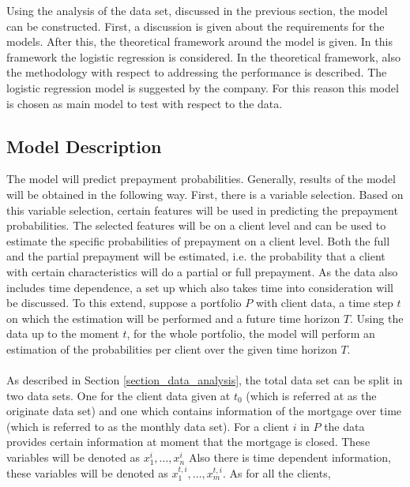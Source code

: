 Using the analysis of the data set, discussed in the previous 
section, the model can be constructed. First, a discussion is given 
about the requirements for the models. After this, the theoretical 
framework around the model is given. In this framework the logistic 
regression is considered. In the theoretical framework, also the 
methodology with respect to addressing the performance is described.
The logistic regression model is suggested by the company. 
For this reason this model is chosen as main model to test with respect 
to the data.  

\subsection{Model Description}
    The model will predict prepayment probabilities. 
    Generally, results of the model will be obtained in the following 
    way. 
    First, there is a variable selection. Based on this variable
    selection, certain features will be used in predicting the prepayment  
    probabilities. The selected features will be on a client level and 
    can be used to estimate the specific probabilities of prepayment 
    on a client level. Both the full and the partial prepayment will 
    be estimated, i.e. the probability that a client with certain 
    characteristics will do a partial or full prepayment. 
    As the data also includes time dependence, a set up which also 
    takes time into consideration will be discussed. To this extend, 
    suppose a portfolio $P$ with client data, a time step $t$ on 
    which the estimation will be performed and a future time horizon $T$. 
    Using the data up to the moment $t$, for the whole portfolio, 
    the model will perform an estimation of the probabilities per 
    client over the given time horizon $T$. 
    \\\\ 
    As described in Section \ref{section_data_analysis}, 
    the total data set can be split in two data sets. One for the 
    client data given at $t_0$ (which is referred at as
    the originate data set) and one which contains information of 
    the mortgage over time (which is referred to as the monthly 
    data set). For a client $i$ in $P$ the data provides certain 
    information at moment that the mortgage is closed. These variables
    will be denoted as  $x_1^i, \ldots, x_n^i$ 
    Also there is time dependent information, these variables will be 
    denoted as  $x_1^{t, i}, \ldots, x_m^{t, i}$. As for all the clients, 
